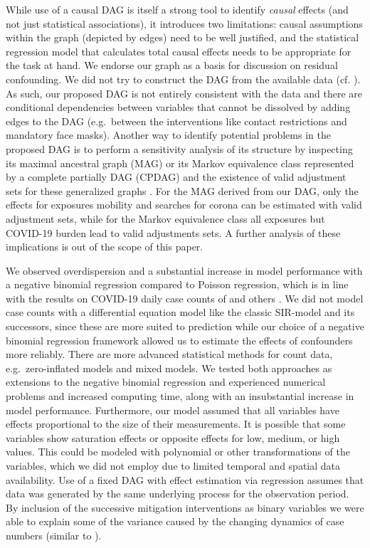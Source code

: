 \documentclass[]{elsarticle} %
\begin{document}
While use of a causal DAG is itself a strong tool to identify \emph{causal} effects (and not just statistical associations), it introduces two limitations: causal assumptions within the graph (depicted by edges) need to be well justified, and the statistical regression model that calculates total causal effects needs to be appropriate for the task at hand. We endorse our graph as a basis for discussion on residual confounding. We did not try to construct the DAG from the available data (cf. \citep{gencoglu2020causal}). As such, our proposed DAG is not entirely consistent with the data and there are conditional dependencies between variables that cannot be dissolved by adding edges to the DAG (e.g.~between the interventions like contact restrictions and mandatory face masks). Another way to identify potential problems in the proposed DAG is to perform a sensitivity analysis of its structure by inspecting its maximal ancestral graph (MAG) or its Markov equivalence class represented by a complete partially DAG (CPDAG) and the existence of valid adjustment sets for these generalized graphs \citep{perkovic2017complete}. For the MAG derived from our DAG, only the effects for exposures mobility and searches for corona can be estimated with valid adjustment sets, while for the Markov equivalence class all exposures but COVID-19 burden lead to valid adjustments sets. A further analysis of these implications is out of the scope of this paper.

We observed overdispersion and a substantial increase in model performance with a negative binomial regression compared to Poisson regression, which is in line with the results on COVID-19 daily case counts of \citet{kraemer_effect_2020} and others \citep{liu_impact_2020, bannister-tyrrell_preliminary_2020, Islamm2743}. We did not model case counts with a differential equation model like the classic SIR-model \citep{kermack1991contributions} and its successors, since these are more suited to prediction \citep[e.g.][]{rkimodellierung} while our choice of a negative binomial regression framework allowed us to estimate the effects of confounders more reliably. There are more advanced statistical methods for count data, e.g.~zero-inflated models and mixed models. We tested both approaches as extensions to the negative binomial regression and experienced numerical problems and increased computing time, along with an insubstantial increase in model performance. Furthermore, our model assumed that all variables have effects proportional to the size of their measurements. It is possible that some variables show saturation effects or opposite effects for low, medium, or high values. This could be modeled with polynomial or other transformations of the variables, which we did not employ due to limited temporal and spatial data availability. Use of a fixed DAG with effect estimation via regression assumes that data was generated by the same underlying process for the observation period. By inclusion of the successive mitigation interventions as binary variables we were able to explain some of the variance caused by the changing dynamics of case numbers (similar to \citep{Islamm2743}).
\end{document}
